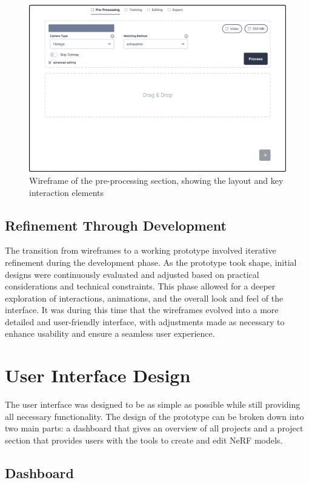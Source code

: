 \begin{figure}[h!]
  \centering
  \includegraphics[width=.8\textwidth]{figures/wireframe.png}
  \caption{Wireframe of the pre-processing section, showing the layout and key interaction elements}
  \label{fig:design:wireframe}
\end{figure}

\subsection*{Refinement Through Development}

The transition from wireframes to a working prototype involved iterative refinement during the development phase.
As the prototype took shape, initial designs were continuously evaluated and adjusted based on practical considerations and technical constraints.
This phase allowed for a deeper exploration of interactions, animations, and the overall look and feel of the interface.
It was during this time that the wireframes evolved into a more detailed and user-friendly interface, with adjustments made as necessary to enhance usability and ensure a seamless user experience.

\section{User Interface Design}
The user interface was designed to be as simple as possible while still providing all necessary functionality.
The design of the prototype can be broken down into two main parts: a dashboard that gives an overview of all projects and a project section that provides users with the tools to create and edit NeRF models.

\subsection*{Dashboard}

